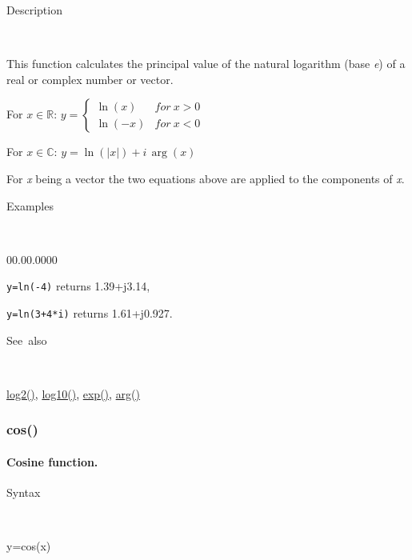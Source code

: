\begin{description}
\item [Description]~
\end{description}
This function calculates the principal value of the natural logarithm
(base \textit{e}) of a real or complex number or vector.

\medskip{}
For $x\in\mathbb{R}$: $y=\left\{ \begin{array}{cc}
\ln\left(x\right) & for\: x>0\\
\ln\left(-x\right) & for\: x<0\end{array}\right.$ 

\medskip{}
For $x\in\mathbb{C}$: $y=\ln\left(\left|x\right|\right)+i\,\arg\left(x\right)$
\medskip{}

For \textit{x} being a vector the two equations above are
applied to the components of \textit{x}.

\begin{description}
\item [Examples]~
\end{description}
\begin{lyxlist}{00.00.0000}
\item [\texttt{y=ln(-4)}]returns 1.39+j3.14,
\item [\texttt{y=ln(3+4{*}i)}]returns 1.61+j0.927.
\end{lyxlist}
\begin{description}
\item [See~also]~
\end{description}
\textcolor{blue}{\hyperlink{log2}{log2()}}\textcolor{black}{,} \textcolor{blue}{\hyperlink{log10}{log10()}}\textcolor{black}{,}
\textcolor{blue}{\hyperlink{exp}{exp()}}\textcolor{black}{,} \textcolor{blue}{\hyperlink{arg}{arg()}}


\newpage
{}


\subsubsection*{\hypertarget{cos}{}{\Large cos()}}


\paragraph{\label{par:Cosine}Cosine function.}

\begin{description}
\item [Syntax]~
\end{description}
y=cos(x)

